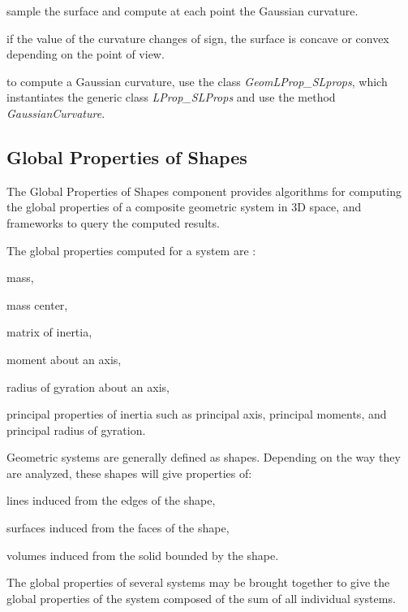 \begin{DoxyEnumerate}
\item sample the surface and compute at each point the Gaussian curvature.
\item if the value of the curvature changes of sign, the surface is concave or convex depending on the point of view.
\item to compute a Gaussian curvature, use the class {\itshape Geom\+L\+Prop\+\_\+\+S\+Lprops}, which instantiates the generic class {\itshape L\+Prop\+\_\+\+S\+L\+Props} and use the method {\itshape Gaussian\+Curvature}.
\end{DoxyEnumerate}\hypertarget{occt_user_guides__modeling_data_occt_modat_4_3}{}\subsection{Global Properties of Shapes}\label{occt_user_guides__modeling_data_occt_modat_4_3}
The Global Properties of Shapes component provides algorithms for computing the global properties of a composite geometric system in 3D space, and frameworks to query the computed results.

The global properties computed for a system are \+:
\begin{DoxyItemize}
\item mass,
\item mass center,
\item matrix of inertia,
\item moment about an axis,
\item radius of gyration about an axis,
\item principal properties of inertia such as principal axis, principal moments, and principal radius of gyration.
\end{DoxyItemize}

Geometric systems are generally defined as shapes. Depending on the way they are analyzed, these shapes will give properties of\+:


\begin{DoxyItemize}
\item lines induced from the edges of the shape,
\item surfaces induced from the faces of the shape,
\item volumes induced from the solid bounded by the shape.
\end{DoxyItemize}

The global properties of several systems may be brought together to give the global properties of the system composed of the sum of all individual systems.

